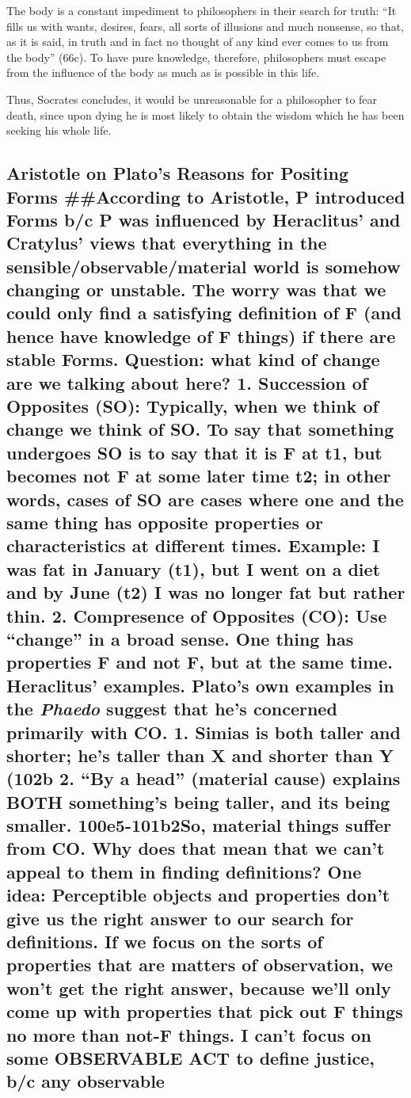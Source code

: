 \documentclass[]{article}
\begin{document}
The body is a constant impediment to philosophers in their search for
truth: ``It fills us with wants, desires, fears, all sorts of illusions
and much nonsense, so that, as it is said, in truth and in fact no
thought of any kind ever comes to us from the body'' (66c). To have pure
knowledge, therefore, philosophers must escape from the influence of the
body as much as is possible in this life.

Thus, Socrates concludes, it would be unreasonable for a philosopher to
fear death, since upon dying he is most likely to obtain the wisdom
which he has been seeking his whole life.

\subsection{Aristotle on Plato's Reasons for Positing Forms
\#\#According to Aristotle, P introduced Forms b/c P was influenced by
Heraclitus' and Cratylus' views that everything in the
sensible/observable/material world is somehow changing or unstable. The
worry was that we could only find a satisfying definition of F (and
hence have knowledge of F things) if there are stable Forms. Question:
what kind of change are we talking about here? 1. Succession of
Opposites (SO): Typically, when we think of change we think of SO. To
say that something undergoes SO is to say that it is F at t1, but
becomes not F at some later time t2; in other words, cases of SO are
cases where one and the same thing has opposite properties or
characteristics at different times. Example: I was fat in January (t1),
but I went on a diet and by June (t2) I was no longer fat but rather
thin. 2. Compresence of Opposites (CO): Use ``change'' in a broad sense.
One thing has properties F and not F, but at the same time. Heraclitus'
examples. Plato's own examples in the \emph{Phaedo} suggest that he's
concerned primarily with CO. 1. Simias is both taller and shorter; he's
taller than X and shorter than Y (102b 2. ``By a head'' (material cause)
explains BOTH something's being taller, and its being smaller.
100e5-101b2So, material things suffer from CO. Why does that mean that
we can't appeal to them in finding definitions? One idea: Perceptible
objects and properties don't give us the right answer to our search for
definitions. If we focus on the sorts of properties that are matters of
observation, we won't get the right answer, because we'll only come up
with properties that pick out F things no more than not-F things. I
can't focus on some OBSERVABLE ACT to define justice, b/c any observable
}
\end{document}
